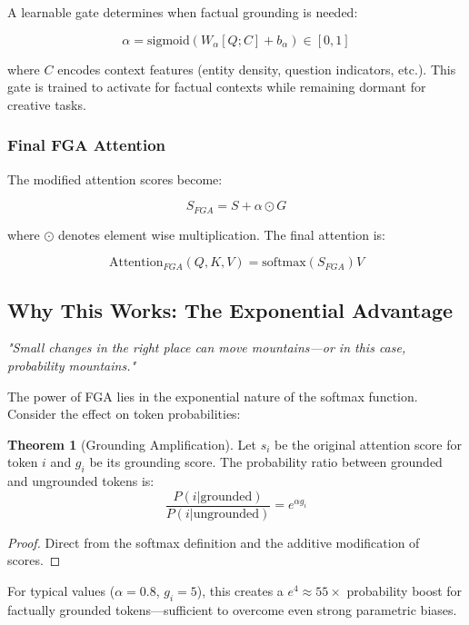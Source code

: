 \documentclass[11pt, a4paper]{article}
\theoremstyle{definition}
\newtheorem{theorem}{Theorem}
\newcommand{\softmax}{\text{softmax}}
\newcommand{\sigmoid}{\text{sigmoid}}
\begin{document}
A learnable gate determines when factual grounding is needed:

\begin{equation}
\alpha = \sigmoid(W_\alpha [Q; C] + b_\alpha) \in [0,1]
\end{equation}

where $C$ encodes context features (entity density, question indicators, etc.). This gate is trained to activate for factual contexts while remaining dormant for creative tasks.

\subsubsection{Final FGA Attention}

The modified attention scores become:

\begin{equation}
S_{FGA} = S + \alpha \odot G
\end{equation}

where $\odot$ denotes element wise multiplication. The final attention is:

\begin{equation}
\text{Attention}_{FGA}(Q, K, V) = \softmax(S_{FGA})V
\end{equation}

\subsection{Why This Works: The Exponential Advantage}

\textit{"Small changes in the right place can move mountains—or in this case, probability mountains."}

The power of FGA lies in the exponential nature of the softmax function. Consider the effect on token probabilities:

\begin{theorem}[Grounding Amplification]
Let $s_i$ be the original attention score for token $i$ and $g_i$ be its grounding score. The probability ratio between grounded and ungrounded tokens is:
$$\frac{P(i|\text{grounded})}{P(i|\text{ungrounded})} = e^{\alpha g_i}$$
\end{theorem}

\begin{proof}
Direct from the softmax definition and the additive modification of scores.
\end{proof}

For typical values ($\alpha = 0.8$, $g_i = 5$), this creates a $e^4 \approx 55\times$ probability boost for factually grounded tokens—sufficient to overcome even strong parametric biases.
\end{document}
